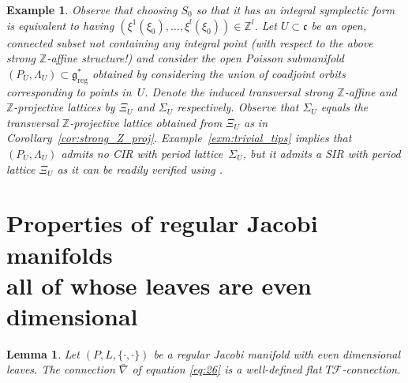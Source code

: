 \documentclass[pdftex]{sigma}
\numberwithin{equation}{section}
\newtheorem{Lemma}[Theorem]{Lemma}
\newtheorem{Example}[Theorem]{Example}
\newcommand{\ZZ}{\mathbb{Z}}
\begin{document}
\begin{Example}
Observe that choosing $S_0$ so that it has an integral symplectic form is equivalent to having $\left(\xi^1(\xi_0),\ldots, \xi^l(\xi_0)\right) \in \ZZ^l$. Let $U \subset \mathfrak{c}$ be an open, connected subset not containing any integral point (with respect to the above strong $\ZZ$-af\/f\/ine structure!) and consider the open Poisson submanifold $(P_U,\Lambda_U) \subset \mathfrak{g}^*_{\mathrm{reg}}$ obtained by considering the union of coadjoint orbits corresponding to points in~$U$. Denote the induced transversal strong $\ZZ$-af\/f\/ine and $\ZZ$-projective lattices by $\Xi_U$ and $\Sigma_U$ respectively. Observe that $\Sigma_U$ equals the transversal $\ZZ$-projective lattice obtained from $\Xi_U$ as in Corollary~\ref{cor:strong_Z_proj}. Example~\ref{exm:trivial_tips} implies that $\left(P_U,\Lambda_U\right)$ admits no CIR with period lattice~$\Sigma_U$, but it admits a SIR with period lattice $\Xi_U$ as it can be readily verif\/ied using \cite[Section~4]{dd}.
\end{Example}

\appendix
\section[Properties of regular Jacobi manifolds all of whose leaves are even dimensional]{Properties of regular Jacobi manifolds\\ all of whose leaves are even dimensional}\label{sec:proofs-prop-regul}

\begin{Lemma}\label{prop:well-defined} Let $(P,L,\{\cdot, \cdot\})$ be a regular Jacobi manifold with even dimensional leaves. The connection $\bar\nabla$ of equation \eqref{eq:26} is a well-defined flat $T \mathcal{F}$-connection.
\end{Lemma}
\end{document}
